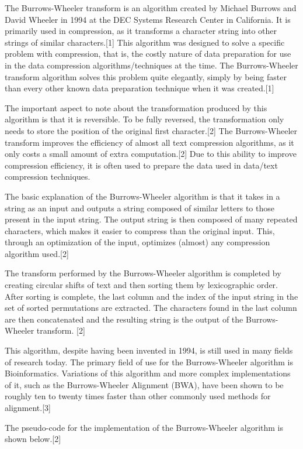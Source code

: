 \documentclass{article}
\begin{document}
   The Burrows-Wheeler transform is an algorithm created by Michael Burrows and David Wheeler in 1994 at the DEC Systems Research Center in California. It is primarily used in compression, as it transforms a character string into other strings of similar characters.[1] This algorithm was designed to solve a specific problem with compression, that is, the costly nature of data preparation for use in the data compression algorithms/techniques at the time. The Burrows-Wheeler transform algorithm solves this problem quite elegantly, simply by being faster than every other known data preparation technique when it was created.[1]

   The important aspect to note about the transformation produced by this algorithm is that it is reversible. To be fully reversed, the transformation only needs to store the position of the original first character.[2] The Burrows-Wheeler transform improves the efficiency of almost all text compression algorithms, as it only costs a small amount of extra computation.[2] Due to this ability to improve compression efficiency, it is often used to prepare the data used in data/text compression techniques. 
   
   The basic explanation of the Burrows-Wheeler algorithm is that it takes in a string as an input and outputs a string composed of similar letters to those present in the input string. The output string is then composed of many repeated characters, which makes it easier to compress than the original input. This, through an optimization of the input, optimizes (almost) any compression algorithm used.[2]
   
   The transform performed by the Burrows-Wheeler algorithm is completed by creating circular shifts of text and then sorting them by lexicographic order. After sorting is complete, the last column and the index of the input string in the set of sorted permutations are extracted. The characters found in the last column are then concatenated and the resulting string is the output of the Burrows-Wheeler transform. [2]
   
   This algorithm, despite having been invented in 1994, is still used in many fields of research today. The primary field of use for the Burrows-Wheeler algorithm is Bioinformatics. Variations of this algorithm and more complex implementations of it, such as the Burrows-Wheeler Alignment (BWA), have been shown to be roughly ten to twenty times faster than other commonly used methods for alignment.[3]
   
   The pseudo-code for the implementation of the Burrows-Wheeler algorithm is shown below.[2]
   
\end{document}
